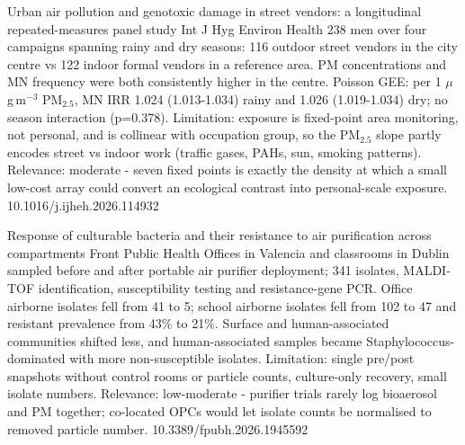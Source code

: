 \documentclass[10pt]{article}
\begin{document}
\par{}\baselineskip{}\baselineskip
{}

{Urban air pollution and genotoxic damage in street vendors: a longitudinal repeated-measures panel study}
{Int J Hyg Environ Health}
{238 men over four campaigns spanning rainy and dry seasons: 116 outdoor street vendors in the city centre vs 122 indoor formal vendors in a reference area. PM concentrations and MN frequency were both consistently higher in the centre. Poisson GEE: per 1 $\mu$g\,m$^{-3}$ PM$_{2.5}$, MN IRR 1.024 (1.013-1.034) rainy and 1.026 (1.019-1.034) dry; no season interaction (p=0.378). Limitation: exposure is fixed-point area monitoring, not personal, and is collinear with occupation group, so the PM$_{2.5}$ slope partly encodes street vs indoor work (traffic gases, PAHs, sun, smoking patterns). Relevance: moderate - seven fixed points is exactly the density at which a small low-cost array could convert an ecological contrast into personal-scale exposure.}
{10.1016/j.ijheh.2026.114932}

{Response of culturable bacteria and their resistance to air purification across compartments}
{Front Public Health}
{Offices in Valencia and classrooms in Dublin sampled before and after portable air purifier deployment; 341 isolates, MALDI-TOF identification, susceptibility testing and resistance-gene PCR. Office airborne isolates fell from 41 to 5; school airborne isolates fell from 102 to 47 and resistant prevalence from 43\% to 21\%. Surface and human-associated communities shifted less, and human-associated samples became Staphylococcus-dominated with more non-susceptible isolates. Limitation: single pre/post snapshots without control rooms or particle counts, culture-only recovery, small isolate numbers. Relevance: low-moderate - purifier trials rarely log bioaerosol and PM together; co-located OPCs would let isolate counts be normalised to removed particle number.}
{10.3389/fpubh.2026.1945592}

\par{}\baselineskip{}\baselineskip
{}
\end{document}
